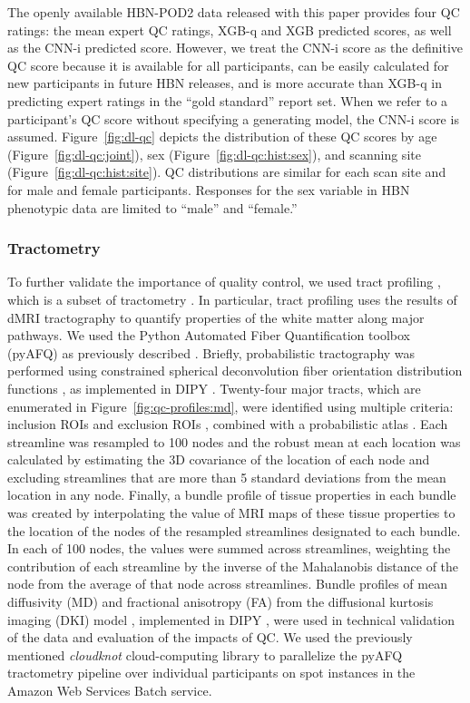 \documentclass[fleqn,10pt,inline]{wlscirep}
\begin{document}
The openly available HBN-POD2 data released with this paper provides four QC ratings: the mean expert QC ratings, XGB-q and
XGB predicted scores, as well as the CNN-i predicted score. However, we treat the CNN-i
score as the definitive QC score because it is available for all participants,
can be easily calculated for new participants in future HBN releases, and is more
accurate than XGB-q in predicting expert ratings in the ``gold standard'' report set. When we refer to a participant's QC score without
specifying a generating model, the CNN-i score is assumed.
Figure~\ref{fig:dl-qc} depicts the distribution of these QC scores by age
(Figure~\ref{fig:dl-qc:joint}), sex (Figure~\ref{fig:dl-qc:hist:sex}), and scanning site
(Figure~\ref{fig:dl-qc:hist:site}). QC distributions are similar for each scan site
and for male and female participants. Responses for the sex variable in HBN phenotypic data are limited to ``male'' and ``female.''

\subsubsection*{Tractometry}

To further validate the importance of quality control, we used tract profiling \cite{yeatman2012-rc,jones2005pasta,colby2012along,odonnell2009tract, kruper2021evaluating}, which is a subset of tractometry \cite{jones2005pasta,bells2011tractometry}. In particular, tract profiling uses the results of dMRI tractography to quantify properties of the white matter along major pathways. We used the Python Automated Fiber Quantification toolbox (pyAFQ) as previously described \cite{kruper2021evaluating}. Briefly, probabilistic tractography was performed using constrained spherical deconvolution fiber orientation distribution functions \cite{tournier2008csd}, as implemented in DIPY \cite{dipy}. Twenty-four major tracts, which are enumerated in Figure~\ref{fig:qc-profiles:md}, were identified using multiple criteria: inclusion ROIs and exclusion ROIs \cite{Wakana2007-nw}, combined with a probabilistic atlas \cite{Hua2008-di}. Each streamline was resampled to 100 nodes and the robust mean at each location was calculated by estimating the 3D covariance of the location of each node and excluding streamlines that are more than 5 standard deviations from the mean location in any node. Finally, a bundle profile of tissue properties in each bundle was created by interpolating the value of MRI maps of these tissue properties to the location of the nodes of the resampled streamlines designated to each bundle. In each of 100 nodes, the values were summed across streamlines, weighting the contribution of each streamline by the inverse of the Mahalanobis distance of the node from the average of that node across streamlines. Bundle profiles of mean diffusivity (MD) and fractional anisotropy (FA) from the diffusional kurtosis imaging (DKI) model \cite{jensen2005-ta}, implemented in DIPY \cite{Henriques2021-lk}, were used in technical validation of the data and evaluation of the impacts of QC.
We used the previously mentioned \emph{cloudknot} cloud-computing library \cite{cloudknot} to parallelize the pyAFQ tractometry pipeline over individual participants on spot instances in the
Amazon Web Services Batch service.
\end{document}
